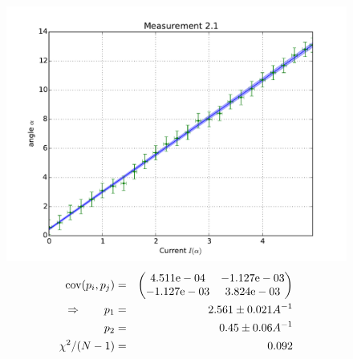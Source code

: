 \begin{figure}
    \begin{centering}
        \includegraphics[width=18cm]{figures/fig21}
\captionsetup{singlelinecheck=off} 
\caption[.]{
\begin{eqnarray*}
    \mathrm{cov}(p_i, p_j) &=& 
    \begin{pmatrix}
        4.511\mathrm{e}-04 &-1.127\mathrm{e}-03 \\
        -1.127\mathrm{e}-03 &3.824\mathrm{e}-03 \\
    \end{pmatrix}
\\ \Rightarrow \qquad
    p_1 &=& 2.561 \pm 0.021 A^{-1}\\
    p_2 &=& 0.45 \pm 0.06 A^{-1} \\ 
    \chi ^2/(N-1) &=&  0.092
\end{eqnarray*}
}

    \end{centering}
\end{figure}
